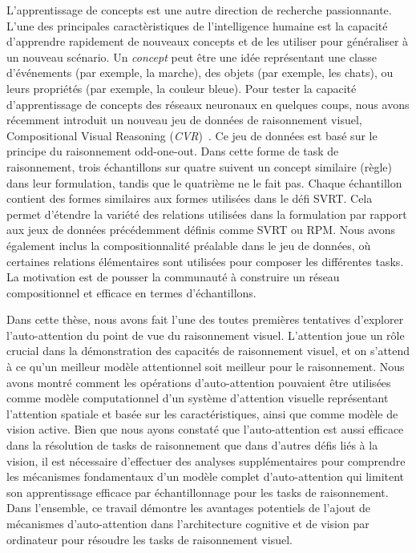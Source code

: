 L'apprentissage de concepts est une autre direction de recherche passionnante. L'une des principales caract\`eristiques de l'intelligence humaine est la capacit\'e d'apprendre rapidement de nouveaux concepts et de les utiliser pour g\'en\'eraliser \`a un nouveau sc\'enario. Un \textit{concept} peut \^etre une id\'ee repr\'esentant une classe d'\'ev\'enements (par exemple, la marche), des objets (par exemple, les chats), ou leurs propri\'et\'es (par exemple, la couleur bleue). Pour tester la capacit\'e d'apprentissage de concepts des r\'eseaux neuronaux en quelques coups, nous avons r\'ecemment introduit un nouveau jeu de donn\'ees de raisonnement visuel, Compositional Visual Reasoning (\textit{CVR})~\citep{zerroug2022benchmark}. Ce jeu de donn\'ees est bas\'e sur le principe du raisonnement odd-one-out. Dans cette forme de task de raisonnement, trois \'echantillons sur quatre suivent un concept similaire (r\`egle) dans leur formulation, tandis que le quatri\`eme ne le fait pas. Chaque \'echantillon contient des formes similaires aux formes utilis\'ees dans le d\'efi SVRT. Cela permet d'\'etendre la vari\'et\'e des relations utilis\'ees dans la formulation par rapport aux jeux de donn\'ees pr\'ec\'edemment d\'efinis comme SVRT ou RPM. Nous avons \'egalement inclus la compositionnalit\'e pr\'ealable dans le jeu de donn\'ees, où certaines relations \'el\'ementaires sont utilis\'ees pour composer les diff\'erentes tasks. La motivation est de pousser la communaut\'e \`a construire un r\'eseau compositionnel et efficace en termes d'\'echantillons.

Dans cette th\`ese, nous avons fait l'une des toutes premi\`eres tentatives d'explorer l'auto-attention du point de vue du raisonnement visuel. L'attention joue un rôle crucial dans la d\'emonstration des capacit\'es de raisonnement visuel, et on s'attend \`a ce qu'un meilleur mod\`ele attentionnel soit meilleur pour le raisonnement. Nous avons montr\'e comment les op\'erations d'auto-attention pouvaient \^etre utilis\'ees comme mod\`ele computationnel d'un syst\`eme d'attention visuelle repr\'esentant l'attention spatiale et bas\'ee sur les caract\'eristiques, ainsi que comme mod\`ele de vision active. Bien que nous ayons constat\'e que l'auto-attention est aussi efficace dans la r\'esolution de tasks de raisonnement que dans d'autres d\'efis li\'es \`a la vision, il est n\'ecessaire d'effectuer des analyses suppl\'ementaires pour comprendre les m\'ecanismes fondamentaux d'un mod\`ele complet d'auto-attention qui limitent son apprentissage efficace par \'echantillonnage pour les tasks de raisonnement. Dans l'ensemble, ce travail d\'emontre les avantages potentiels de l'ajout de m\'ecanismes d'auto-attention dans l'architecture cognitive et de vision par ordinateur pour r\'esoudre les tasks de raisonnement visuel. 